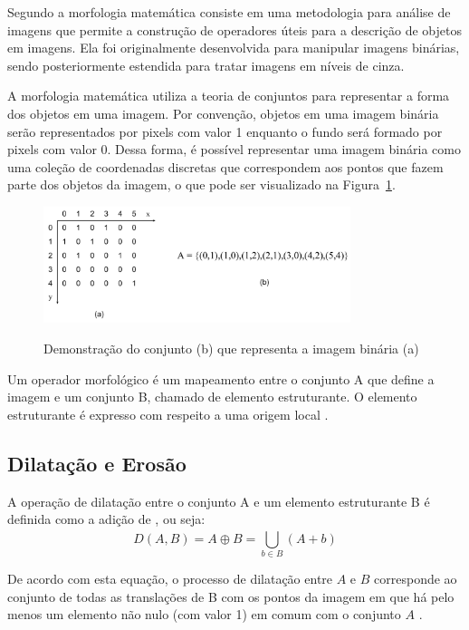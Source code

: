 \documentclass[12pt,oneside,a4paper,english,french,spanish,brazil,]{abntex2}
\begin{document}
Segundo \citet{pedrini:2008} a morfologia matemática consiste em uma metodologia para análise de imagens que permite a construção de operadores úteis para a descrição de objetos em imagens. Ela foi originalmente desenvolvida para manipular imagens binárias, sendo posteriormente estendida para tratar imagens em níveis de cinza.

A morfologia matemática utiliza a teoria de conjuntos para representar a forma dos objetos em uma imagem. Por convenção, objetos em uma imagem binária serão representados por pixels com valor 1 enquanto o fundo será formado por pixels com valor 0. Dessa forma, é possível representar uma imagem binária como uma coleção de coordenadas discretas que correspondem aos pontos que fazem parte dos objetos da imagem, o que pode ser visualizado na Figura~\ref{fig:PDI_Conjunto}.

\begin{figure}[ht]
\centering
\caption{Demonstração do conjunto (b) que representa a imagem binária (a)}
\includegraphics[width=0.8\textwidth]{imagens/PDI_Conjunto.pdf}
\label{fig:PDI_Conjunto}
\end{figure}

Um operador morfológico é um mapeamento entre o conjunto A que define a imagem e um conjunto B, chamado de elemento estruturante. O elemento estruturante é expresso com respeito a uma origem local \cite{pedrini:2008}.

\subsection{Dilatação e Erosão}

A operação de dilatação entre o conjunto A e um elemento estruturante B é definida como a adição de \citet{minkowski:1911}, ou seja: \[D(A,B)=A\oplus B=\bigcup_{b\in B}^{ } (A+b)\]

De acordo com esta equação, o processo de dilatação entre \(A\) e \(B\) corresponde ao conjunto de todas as translações de B com os pontos da imagem em que há pelo menos um elemento não nulo (com valor 1) em comum com o conjunto \(A\) \cite{pedrini:2008}. 
\end{document}
